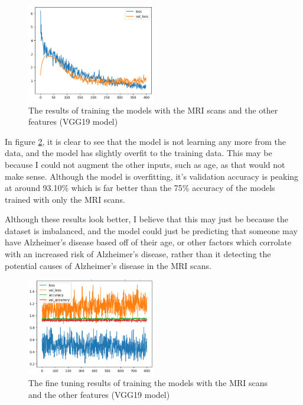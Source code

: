\documentclass[]{final_report}
\begin{document}
\begin{figure}[ht!]
  \centering
  \includegraphics[width=0.5\textwidth]{images/VGG19-OASIS-1-loss.png}
  \caption{The results of training the models with the MRI scans and the other features (VGG19 model)}
  \label{fig:VGG19-OASIS-1-loss}
\end{figure}

In figure \ref{fig:VGG19-OASIS-1-800-epoch}, it is clear to see that the model is not learning any more from the data, and the model has slightly overfit to the training data. This may be because I could not augment the other inputs, such as age, as that would not make sense. Although the model is overfitting, it's validation accuracy is peaking at around 93.10\% which is far better than the 75\% accuracy of the models trained with only the MRI scans.

Although these results look better, I believe that this may just be because the dataset is imbalanced, and the model could just be predicting that someone may have Alzheimer's disease based off of their age, or other factors which corrolate with an increased risk of Alzheimer's disease, rather than it detecting the potential causes of Alzheimer's disease in the MRI scans.

\begin{figure}[ht!]
  \centering
  \includegraphics[width=0.5\textwidth]{images/VGG19-OASIS-1-800-epoch.png}
  \caption{The fine tuning results of training the models with the MRI scans and the other features (VGG19 model)}
  \label{fig:VGG19-OASIS-1-800-epoch}
\end{figure}
\end{document}
